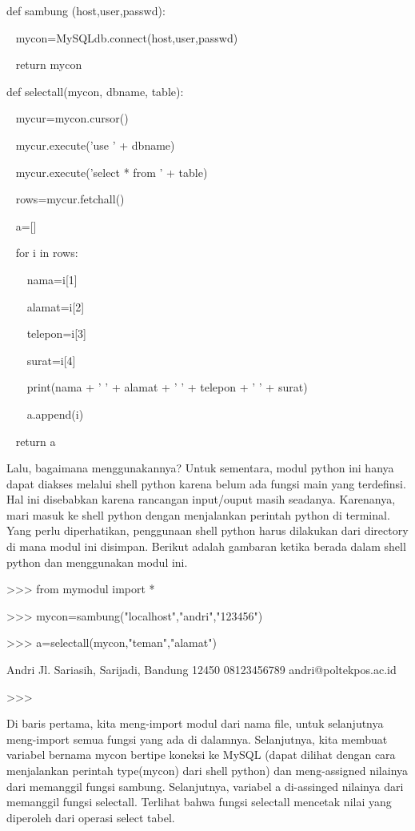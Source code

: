 \noindent 
def sambung (host,user,passwd): \par
\noindent 
~ mycon=MySQLdb.connect(host,user,passwd) \par
\noindent 
~ return mycon \par
\vspace{12pt}
\noindent 
def selectall(mycon, dbname, table): \par
\noindent 
~ mycur=mycon.cursor() \par
\noindent 
~ mycur.execute('use ' + dbname) \par
\noindent 
~ mycur.execute('select * from ' + table) \par
\noindent 
~ rows=mycur.fetchall() \par
\noindent 
~ a=[] \par
\noindent 
~ for i in rows: \par
\noindent 
~~~ nama=i[1] \par
\noindent 
~~~ alamat=i[2] \par
\noindent 
~~~ telepon=i[3] \par
\noindent 
~~~ surat=i[4] \par
\noindent 
~~~ print(nama + ' ' + alamat + ' ' + telepon + ' ' + surat) \par
\noindent 
~~~ a.append(i) \par
\noindent 
~ return a \par
Lalu, bagaimana menggunakannya? Untuk sementara, modul python ini hanya dapat diakses melalui shell python karena belum ada fungsi main yang terdefinsi. Hal ini disebabkan karena rancangan input/ouput masih seadanya. Karenanya, mari masuk ke shell python dengan menjalankan perintah python di terminal. Yang perlu diperhatikan, penggunaan shell python harus dilakukan dari directory di mana modul ini disimpan. Berikut adalah gambaran ketika berada dalam shell python dan menggunakan modul ini. \par
\noindent 
>>> from mymodul import * \par
\noindent 
>>> mycon=sambung("localhost","andri","123456") \par
\noindent 
>>> a=selectall(mycon,"teman","alamat") \par
\noindent 
Andri Jl. Sariasih, Sarijadi, Bandung 12450 08123456789 andri@poltekpos.ac.id \par
\noindent 
>>> \par
Di baris pertama, kita meng-import modul dari nama file, untuk selanjutnya meng-import semua fungsi yang ada di dalamnya. Selanjutnya, kita membuat variabel bernama mycon bertipe koneksi ke MySQL (dapat dilihat dengan cara menjalankan perintah type(mycon) dari shell python) dan meng-assigned nilainya dari memanggil fungsi sambung. Selanjutnya, variabel a di-assinged nilainya dari memanggil fungsi selectall. Terlihat bahwa fungsi selectall mencetak nilai yang diperoleh dari operasi select tabel. \par
